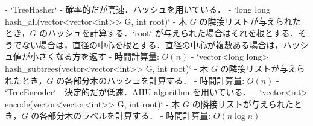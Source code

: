 \begin{small}
\begin{markdown}
- `TreeHasher`
    - 確率的だが高速．ハッシュを用いている．
    - `long long hash\_all(vector<vector<int>> G, int root)`
        - 木 $G$ の隣接リストが与えられたとき，$G$ のハッシュを計算する．`root` が与えられた場合はそれを根とする．そうでない場合は，直径の中心を根とする．直径の中心が複数ある場合は，ハッシュ値が小さくなる方を返す
        - 時間計算量: $O(n)$
    - `vector<long long> hash\_subtrees(vector<vector<int>> G, int root)`
        - 木 $G$ の隣接リストが与えられたとき，$G$ の各部分木のハッシュを計算する．
        - 時間計算量: $O(n)$
- `TreeEncoder`
    - 決定的だが低速．AHU algorithm を用いている．
    - `vector<int> encode(vector<vector<int>> G, int root)`
        - 木 $G$ の隣接リストが与えられたとき，$G$ の各部分木のラベルを計算する．
        - 時間計算量: $O(n\log n)$


\end{markdown}
\end{small}

